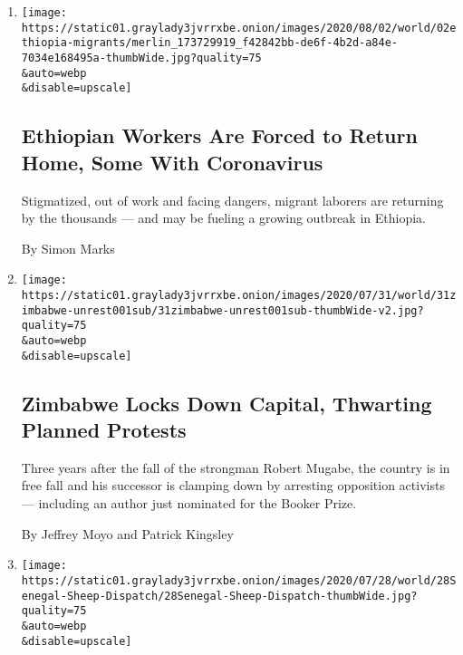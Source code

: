 \begin{enumerate}
\def\labelenumi{\arabic{enumi}.}
\item
  \href{/2020/08/01/world/africa/ethiopian-migrant-workers-coronavirus.html}{}

  \texttt{[image: https://static01.graylady3jvrrxbe.onion/images/2020/08/02/world/02ethiopia-migrants/merlin\_173729919\_f42842bb-de6f-4b2d-a84e-7034e168495a-thumbWide.jpg?quality=75\\\&auto=webp\\\&disable=upscale]}

  \hypertarget{ethiopian-workers-are-forced-to-return-home-some-with-coronavirus}{%
  \subsection{Ethiopian Workers Are Forced to Return Home, Some With
  Coronavirus}\label{ethiopian-workers-are-forced-to-return-home-some-with-coronavirus}}

  Stigmatized, out of work and facing dangers, migrant laborers are
  returning by the thousands --- and may be fueling a growing outbreak
  in Ethiopia.

  By Simon Marks
\item
  \href{/2020/07/31/world/africa/zimbabwe-coronavirus-protest.html}{}

  \texttt{[image: https://static01.graylady3jvrrxbe.onion/images/2020/07/31/world/31zimbabwe-unrest001sub/31zimbabwe-unrest001sub-thumbWide-v2.jpg?quality=75\\\&auto=webp\\\&disable=upscale]}

  \hypertarget{zimbabwe-locks-down-capital-thwarting-planned-protests}{%
  \subsection{Zimbabwe Locks Down Capital, Thwarting Planned
  Protests}\label{zimbabwe-locks-down-capital-thwarting-planned-protests}}

  Three years after the fall of the strongman Robert Mugabe, the country
  is in free fall and his successor is clamping down by arresting
  opposition activists --- including an author just nominated for the
  Booker Prize.

  By Jeffrey Moyo and Patrick Kingsley
\item
  \href{/2020/07/29/world/africa/senegal-tabaski-sheep-eid-adha.html}{}

  \texttt{[image: https://static01.graylady3jvrrxbe.onion/images/2020/07/28/world/28Senegal-Sheep-Dispatch/28Senegal-Sheep-Dispatch-thumbWide.jpg?quality=75\\\&auto=webp\\\&disable=upscale]}


\end{enumerate}
